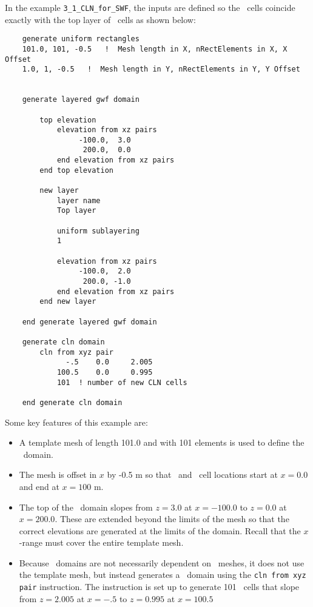 In the example \texttt{3\_1\_CLN\_for\_SWF}, the inputs are defined so the \cln\ cells coincide exactly with the top layer of \gwf\ cells as shown below:
\begin{verbatim}
    generate uniform rectangles
    101.0, 101, -0.5   !  Mesh length in X, nRectElements in X, X Offset
    1.0, 1, -0.5   !  Mesh length in Y, nRectElements in Y, Y Offset


    generate layered gwf domain

        top elevation
            elevation from xz pairs
                 -100.0,  3.0
                  200.0,  0.0
            end elevation from xz pairs
        end top elevation

        new layer
            layer name
            Top layer

            uniform sublayering
            1

            elevation from xz pairs
                 -100.0,  2.0
                  200.0, -1.0
            end elevation from xz pairs
        end new layer

    end generate layered gwf domain

    generate cln domain
        cln from xyz pair
              -.5    0.0     2.005
            100.5    0.0     0.995
            101  ! number of new CLN cells

    end generate cln domain

\end{verbatim}

Some key features of this example are:
\begin{itemize}
    \item A template mesh of length 101.0 and with 101 elements is used to define the \gwf\ domain.
    \item The mesh is offset in $x$ by -0.5 m so that \gwf\ and \cln\ cell locations start at $x=0.0$ and end at $x=100$ m.
    \item The top of the \gwf\ domain slopes from $z=3.0$ at $x=-100.0$ to $z=0.0$ at $x=200.0$.  These are extended beyond the limits of the mesh so that the correct elevations are generated at the limits of the domain. Recall that the $x$-range must cover the entire template mesh.
    \item Because \cln\ domains are not necessarily dependent on \gwf\ meshes, it does not use the template mesh, but instead generates a \cln\ domain using the  \texttt{cln from xyz pair} instruction.  The instruction is set up to generate 101 \cln\ cells that slope from $z=2.005$ at $x=-.5$ to $z=0.995$ at $x=100.5$
\end{itemize}

